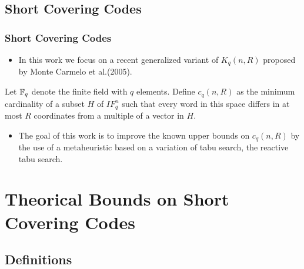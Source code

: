 \documentclass{beamer}
\begin{document}
\subsection{Short Covering Codes}

\begin{frame}
  \frametitle{Short Covering Codes}
{
	
	\begin{itemize}
		\item In this work we focus on a recent generalized variant of $K_{q}(n,R)$ proposed by Monte Carmelo et al.(2005).
	\end{itemize} \pause
	
	\begin{definition}
	Let $\Bbb{F}_{q}$ denote the finite field with $q$ elements. Define
$c_{q}(n,R)$ as the minimum cardinality of a subset $H$ of
$\mbox{$I\!\! F\!$}_{q}^{n}$ such that every word in this space differs in at most $R$
coordinates from a multiple of a vector in $H$.
	\end{definition}

	\begin{itemize}
		\item The goal of this work is to improve the known upper bounds on $c_{q}(n,R)$ by the use of a metaheuristic
based on a variation of tabu search, the reactive tabu search.
	\end{itemize}

}
\end{frame}


\section{Theorical Bounds on Short Covering Codes}

\subsection{Definitions}
\end{document}
